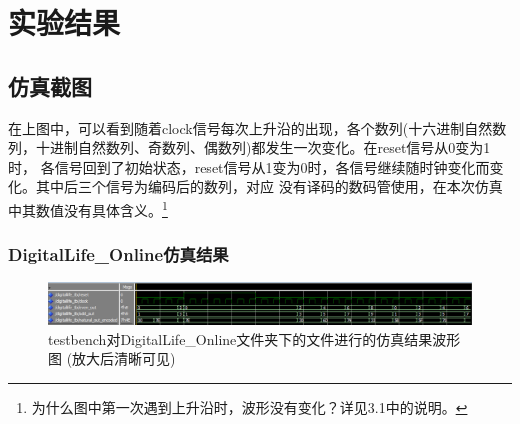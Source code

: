 \documentclass[UTF8]{article}
\begin{document}
 

\section{实验结果}
\subsection{仿真截图}





\qquad 在上图中，可以看到随着clock信号每次上升沿的出现，各个数列(十六进制自然数列，十进制自然数列、奇数列、偶数列)都发生一次变化。在reset信号从0变为1时，
各信号回到了初始状态，reset信号从1变为0时，各信号继续随时钟变化而变化。其中后三个信号为编码后的数列，对应
没有译码的数码管使用，在本次仿真中其数值没有具体含义。\footnote{为什么图中第一次遇到上升沿时，波形没有变化？详见3.1中的说明。}


\subsubsection{DigitalLife\_Online仿真结果}
\begin{figure}[h]
    \centering
    \includegraphics[width=\textwidth]{DL_Online_testbench.png}
    \caption{testbench对DigitalLife\_Online文件夹下的文件进行的仿真结果波形图 (放大后清晰可见)}
\end{figure}
\end{document}
